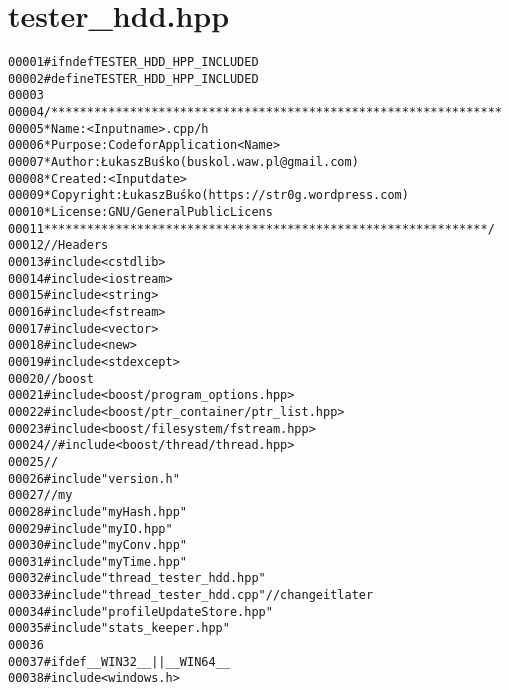 \hypertarget{tester__hdd_8hpp_source}{
\section{tester\_\-hdd.hpp}
}


\begin{footnotesize}\begin{alltt}
00001 \textcolor{preprocessor}{#ifndef TESTER\_HDD\_HPP\_INCLUDED}
00002 \textcolor{preprocessor}{}\textcolor{preprocessor}{#define TESTER\_HDD\_HPP\_INCLUDED}
00003 \textcolor{preprocessor}{}
00004 \textcolor{comment}{/***************************************************************}
00005 \textcolor{comment}{ * Name:      <Input name>.cpp/h}
00006 \textcolor{comment}{ * Purpose:   Code for Application <Name>}
00007 \textcolor{comment}{ * Author:    Łukasz Buśko (buskol.waw.pl@gmail.com)}
00008 \textcolor{comment}{ * Created:   <Input date>}
00009 \textcolor{comment}{ * Copyright: Łukasz Buśko (https://str0g.wordpress.com)}
00010 \textcolor{comment}{ * License:   GNU / General Public Licens}
00011 \textcolor{comment}{ **************************************************************/}
00012 \textcolor{comment}{//Headers}
00013 \textcolor{preprocessor}{#include <cstdlib>}
00014 \textcolor{preprocessor}{#include <iostream>}
00015 \textcolor{preprocessor}{#include <string>}
00016 \textcolor{preprocessor}{#include <fstream>}
00017 \textcolor{preprocessor}{#include <vector>}
00018 \textcolor{preprocessor}{#include <new>}
00019 \textcolor{preprocessor}{#include <stdexcept>}
00020 \textcolor{comment}{//boost}
00021 \textcolor{preprocessor}{#include <boost/program\_options.hpp>}
00022 \textcolor{preprocessor}{#include <boost/ptr\_container/ptr\_list.hpp>}
00023 \textcolor{preprocessor}{#include <boost/filesystem/fstream.hpp>}
00024 \textcolor{comment}{//#include <boost/thread/thread.hpp>}
00025 \textcolor{comment}{//}
00026 \textcolor{preprocessor}{#include "version.h"}
00027 \textcolor{comment}{//my}
00028 \textcolor{preprocessor}{#include "myHash.hpp"}
00029 \textcolor{preprocessor}{#include "myIO.hpp"}
00030 \textcolor{preprocessor}{#include "myConv.hpp"}
00031 \textcolor{preprocessor}{#include "myTime.hpp"}
00032 \textcolor{preprocessor}{#include "thread\_tester\_hdd.hpp"}
00033 \textcolor{preprocessor}{#include "thread\_tester\_hdd.cpp"}\textcolor{comment}{//change it later}
00034 \textcolor{preprocessor}{#include "profileUpdateStore.hpp"}
00035 \textcolor{preprocessor}{#include "stats\_keeper.hpp"}
00036 
00037 \textcolor{preprocessor}{#ifdef \_\_WIN32\_\_ || \_\_WIN64\_\_}
00038 \textcolor{preprocessor}{}\textcolor{preprocessor}{#include <windows.h>}

\end{alltt}
\end{footnotesize}
